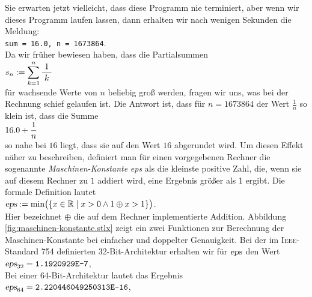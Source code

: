 Sie erwarten jetzt vielleicht, dass diese Programm nie terminiert, aber wenn wir dieses Programm
laufen lassen, dann erhalten wir nach wenigen Sekunden die Meldung:
\\[0.2cm]
\hspace*{1.3cm}
\texttt{sum = 16.0, n = 1673864}.
\\[0.2cm]
Da wir fr\"uher bewiesen haben, dass die Partialsummen
\\[0.2cm]
\hspace*{1.3cm}
$\displaystyle s_n := \sum\limits_{k=1}^n \displaystyle\frac{\;\displaystyle1\;}{\;\displaystyle k\;}$ 
\\[0.2cm]
f\"ur wachsende Werte von $n$ beliebig gro{\ss} werden, fragen wir uns, was bei der Rechnung schief gelaufen ist.
Die Antwort ist, dass f\"ur $n = 1673864$ der Wert $\frac{1}{n}$ so klein ist, dass die Summe
\\[0.2cm]
\hspace*{1.3cm}
$\displaystyle 16.0 + \frac{1}{n}$
\\[0.2cm]
so nahe bei $16$ liegt, dass sie auf den Wert $16$ abgerundet wird.  Um diesen Effekt n\"aher
zu beschreiben, definiert man f\"ur einen vorgegebenen Rechner die sogenannte
\emph{Maschinen-Konstante} \textsl{eps} als die kleinste positive Zahl, die, wenn sie auf diesem Rechner zu
$1$ addiert wird, eine Ergebnis gr\"o{\ss}er als 1 ergibt.  Die formale Definition lautet
\\[0.2cm]
\hspace*{1.3cm}
$\textsl{eps} := \min\bigl( \{ x \in \mathbb{R} \mid x > 0 \wedge 1 \oplus x > 1 \} \bigr)$.
\\[0.2cm]
Hier bezeichnet $\oplus$ die auf dem Rechner implementierte Addition.
Abbildung \ref{fig:maschinen-konstante.stlx} zeigt ein zwei Funktionen zur Berechnung der
Maschinen-Konstante bei einfacher und doppelter Genauigkeit.  Bei der im \textsc{Ieee}-Standard 754
definierten 32-Bit-Architektur erhalten wir f\"ur $\textsl{eps}$ den Wert
\\[0.2cm]
\hspace*{1.3cm}
$\textsl{eps}_{32} = \texttt{1.1920929E-7}$,
\\[0.2cm]
Bei einer 64-Bit-Architektur lautet das Ergebnis
\\[0.2cm]
\hspace*{1.3cm}
$\textsl{eps}_{64} = \texttt{2.220446049250313E-16}$,


